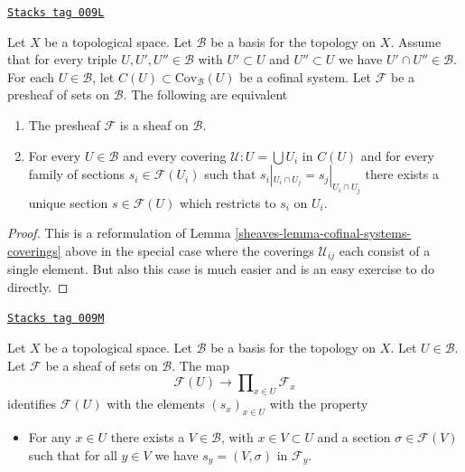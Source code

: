 \begin{lemma}
\label{sheaves-lemma-cofinal-systems-coverings-standard-case}
\href{https://stacks.math.columbia.edu/tag/009L}{\texttt{Stacks tag 009L}}

Let $X$ be a topological space. Let $\mathcal{B}$ be a basis for the
topology on $X$. Assume that for every triple $U, U', U'' \in \mathcal{B}$
with $U' \subset U$ and $U'' \subset U$ we have $U' \cap U'' \in \mathcal{B}$.
For each $U \in \mathcal{B}$, let $C(U) \subset \text{Cov}_\mathcal{B}(U)$
be a cofinal system.
Let $\mathcal{F}$ be a presheaf of sets on $\mathcal{B}$.
The following are equivalent
\begin{enumerate}
\item The presheaf $\mathcal{F}$ is a sheaf on $\mathcal{B}$.
\item For every $U \in \mathcal{B}$ and every covering
$\mathcal{U} : U = \bigcup U_i$ in $C(U)$ and for every
family of sections $s_i \in \mathcal{F}(U_i)$ such
that $s_i|_{U_i \cap U_j} = s_j|_{U_i \cap U_j}$ there
exists a unique section $s \in \mathcal{F}(U)$ which
restricts to $s_i$ on $U_i$.
\end{enumerate}
\end{lemma}

\begin{proof}

This is a reformulation of
Lemma \ref{sheaves-lemma-cofinal-systems-coverings} above
in the special case where the coverings $\mathcal{U}_{ij}$
each consist of a single element. But also this case is much
easier and is an easy exercise to do directly.
\end{proof}

\begin{lemma}
\label{sheaves-lemma-condition-star-sections}
\href{https://stacks.math.columbia.edu/tag/009M}{\texttt{Stacks tag 009M}}

Let $X$ be a topological space.
Let $\mathcal{B}$ be a basis for the topology on $X$.
Let $U \in \mathcal{B}$.
Let $\mathcal{F}$ be a sheaf of sets on $\mathcal{B}$.
The map
$$
\mathcal{F}(U) \to \prod\nolimits_{x \in U} \mathcal{F}_x
$$
identifies $\mathcal{F}(U)$ with the elements $(s_x)_{x\in U}$
with the property
\begin{itemize}
\item[(*)] For any $x \in U$ there exists a $V \in \mathcal{B}$,
with $x \in V \subset U$ and a section $\sigma \in \mathcal{F}(V)$
such that for all $y \in V$ we have $s_y = (V, \sigma)$ in $\mathcal{F}_y$.
\end{itemize}
\end{lemma}

